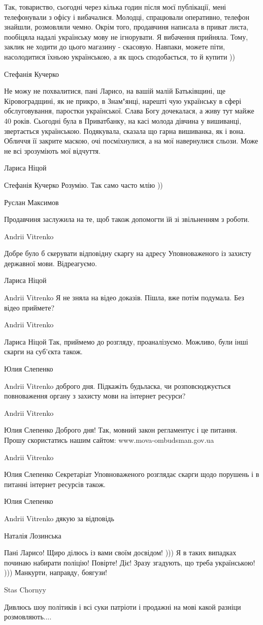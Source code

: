 Так, товариство, сьогодні через кілька годин після моєї публікації, мені
телефонували з офісу і вибачалися. Молодці, спрацювали оперативно, телефон
знайшли, розмовляли чемно. Окрім того, продавчиня написала в приват листа,
пообіцяла надалі українську мову не ігнорувати. Я вибачення прийняла. Тому,
заклик не ходити до цього магазину - скасовую. Навпаки, можете піти,
насолодитися їхньою українською, а як щось сподобається, то й купити ))


Стефанія Кучерко

Не можу не похвалитися, пані Ларисо, на вашій малій Батьківщині, ще
Кіровоградщині, як не прикро, в Знам"янці, нарешті чую українську в сфері
обслуговування, паростки української. Слава Богу дочекалася, а живу тут майже 40
років. Сьогодні була в Приватбанку, на касі молода дівчина у вишиванці,
звертається українською. Подякувала, сказала що гарна вишиванка, як і
вона. Обличчя її закрите маскою, очі посміхнулися, а на мої навернулися
сльози. Може не всі зрозуміють мої відчуття.

Лариса Ніцой

Стефанія Кучерко Розумію. Так само часто млію ))

Руслан Максимов

Продавчиня заслужила на те, щоб також допомогти їй зі звільненням з роботи.

Andrii Vitrenko

Добре було б скерувати відповідну скаргу на адресу Уповноваженого із захисту
державної мови. Відреагуємо.

Лариса Ніцой

Andrii Vitrenko Я не зняла на відео доказів. Пішла, вже потім подумала. Без
відео приймете?

Andrii Vitrenko

Лариса Ніцой Так, приймемо до розгляду, проаналізуємо. Можливо, були інші
скарги на суб'єкта також.

Юлия Слепенко

Andrii Vitrenko доброго дня. Підкажіть будьласка, чи розповсюджується
повноваження органу з захисту мови на інтернет ресурси?

Andrii Vitrenko

Юлия Слепенко Доброго дня! Так, мовний закон регламентує і це питання. Прошу
скористатись нашим сайтом: www.mova-ombudsman.gov.ua

Andrii Vitrenko

Юлия Слепенко Секретаріат Уповноваженого розглядає скарги щодо порушень і в питанні інтернет ресурсів також.

Юлия Слепенко

Andrii Vitrenko дякую за відповідь

Наталія Лозинська

Пані Ларисо! Щиро ділюсь із вами своїм досвідом! ))) Я в таких випадках починаю
набирати поліцію! Повірте! Діє! Зразу згадують, що треба українською! )))
Манкурти, направду, боягузи!

Stas Chornyy

Дивлюсь шоу політиків і всі суки патріоти і продажні на мові какой разніци
розмовляють....
